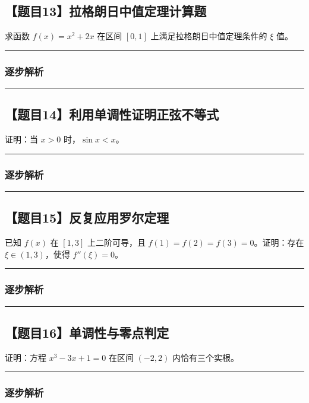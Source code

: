 \documentclass[UTF8]{ctexart}
\newenvironment{redenv}{\color{red}}{}
\newcommand{\problemrule}{\noindent\rule{\textwidth}{1.5pt}\vspace{-0.8em}}
\newcommand{\analysisrule}{\noindent\rule{\textwidth}{0.8pt}\vspace{-0.8em}}
\begin{document}
\subsection*{【题目13】拉格朗日中值定理计算题}
求函数 $f(x) = x^2 + 2x$ 在区间 $[0, 1]$ 上满足拉格朗日中值定理条件的 $\xi$ 值。

\begin{redenv}
\analysisrule
\subsubsection*{逐步解析}
\vspace{8cm} %
\end{redenv}

\vspace{2em}
\problemrule
\subsection*{【题目14】利用单调性证明正弦不等式}
证明：当 $x > 0$ 时，$\sin x < x$。

\begin{redenv}
\analysisrule
\subsubsection*{逐步解析}
\vspace{8cm} %
\end{redenv}

\vspace{2em}
\problemrule
\subsection*{【题目15】反复应用罗尔定理}
已知 $f(x)$ 在 $[1, 3]$ 上二阶可导，且 $f(1)=f(2)=f(3)=0$。证明：存在 $\xi \in (1, 3)$，使得 $f''(\xi)=0$。

\begin{redenv}
\analysisrule
\subsubsection*{逐步解析}
\vspace{8cm} %
\end{redenv}

\vspace{2em}
\problemrule
\subsection*{【题目16】单调性与零点判定}
证明：方程 $x^3 - 3x + 1 = 0$ 在区间 $(-2, 2)$ 内恰有三个实根。

\begin{redenv}
\analysisrule
\subsubsection*{逐步解析}
\vspace{8cm} %
\end{redenv}
\end{document}
